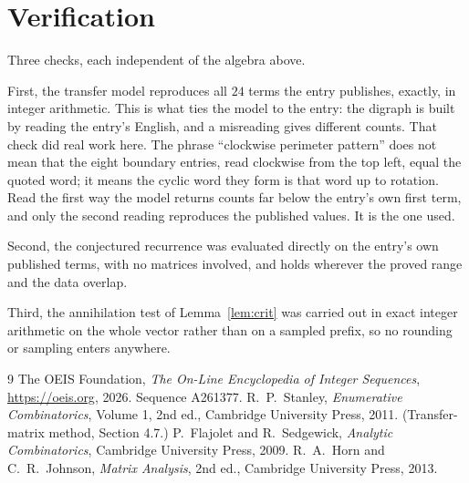 \documentclass[11pt,a4paper]{article}
\theoremstyle{plain}
\theoremstyle{definition}
\begin{document}
\section{Verification}

Three checks, each independent of the algebra above.

First, the transfer model reproduces all $24$ terms the entry publishes, exactly, in
integer arithmetic. This is what ties the model to the entry: the digraph is built by reading
the entry's English, and a misreading gives different counts. That check did real work here. The phrase ``clockwise perimeter pattern'' does not mean that the eight boundary entries, read clockwise from the top left, equal the quoted word; it means the cyclic word they form is that word up to rotation. Read the first way the model returns counts far below the entry's own first term, and only the second reading reproduces the published values. It is the one used.

Second, the conjectured recurrence was evaluated directly on the entry's own published terms,
with no matrices involved, and holds wherever the proved range and the data overlap.

Third, the annihilation test of Lemma~\ref{lem:crit} was carried out in exact integer
arithmetic on the whole vector rather than on a sampled prefix, so no rounding or sampling
enters anywhere.

\begin{thebibliography}{9}
 The OEIS Foundation, \emph{The On-Line Encyclopedia of Integer
Sequences}, \url{https://oeis.org}, 2026. Sequence A261377.
 R.~P.~Stanley, \emph{Enumerative Combinatorics}, Volume 1, 2nd ed.,
Cambridge University Press, 2011. (Transfer-matrix method, Section 4.7.)
 P.~Flajolet and R.~Sedgewick, \emph{Analytic Combinatorics}, Cambridge
University Press, 2009.
 R.~A.~Horn and C.~R.~Johnson, \emph{Matrix Analysis}, 2nd ed., Cambridge
University Press, 2013.
\end{thebibliography}
\end{document}
